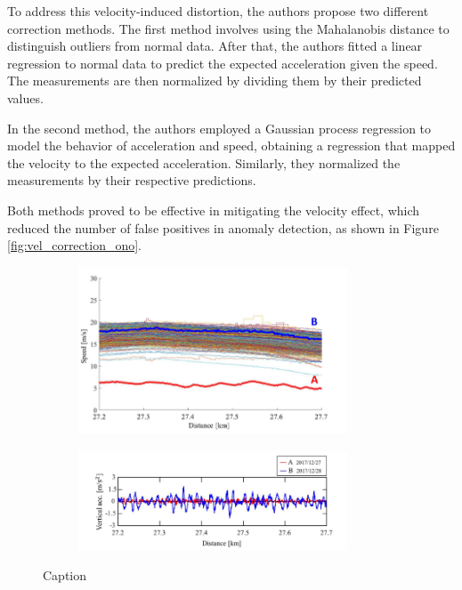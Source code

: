 To address this velocity-induced distortion, the authors propose two different correction methods. The first method involves using the Mahalanobis distance to distinguish outliers from normal data. After that, the authors fitted a linear regression to normal data to predict the expected acceleration given the speed. The measurements are then normalized by dividing them by their predicted values. 

In the second method, the authors employed a Gaussian process regression to model the behavior of acceleration and speed, obtaining a regression that mapped the velocity to the expected acceleration. Similarly, they normalized the measurements by their respective predictions. 

Both methods proved to be effective in mitigating the velocity effect, which reduced the number of false positives in anomaly detection, as shown in Figure \ref{fig:vel_correction_ono}.

\begin{figure}[H]
    \centering
    \begin{subfigure}{0.45\textwidth}
        \includegraphics[width=8cm]{Cap2_LitReview/Vel_effect/vel_profiles.png}
        \caption{\cite{Hironori_ONO202322-00239}}
        \label{fig:vel_effect_ono-a}
    \end{subfigure}
    \hspace{0.3cm}
    \begin{subfigure}{0.45\textwidth}
        \includegraphics[width=8cm]{Cap2_LitReview/Vel_effect/accel_measurements.png}
        \caption{\cite{Hironori_ONO202322-00239}}
        \label{fig:vel_effect_ono-b}
    \end{subfigure}
    \caption{Caption}
    \label{fig:vel_effect_ono}
\end{figure}

